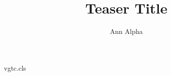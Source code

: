 \begin{filecontents*}[overwrite]{vgtc.cls}
\newcommand{\vgtc@empty}{}
\newcommand{\vgtc@teaser}{}
\newcommand{\teaser}[1]{\renewcommand{\vgtc@teaser}{\begin{minipage}{\linewidth}#1\end{minipage}}}
\newcommand{\vgtc@abstxt}{}
\let\origabstract\abstract
\let\endorigabstract\endabstract
\renewcommand{\abstract}[1]{\renewcommand{\vgtc@abstxt}{#1}}
\renewcommand{\@maketitle}{%
  \begin{center}%
    {\LARGE\@title\par}%
    \vspace{1\baselineskip}%
    \begin{tabular}[t]{c}\@author\end{tabular}\par
    \ifx\vgtc@teaser\vgtc@empty\else
      {\begingroup\def\@captype{figure}\vgtc@teaser\endgroup\par}%
    \fi
  \end{center}\par}
\let\vgtc@origmaketitle\maketitle
\renewcommand{\maketitle}{%
  \vgtc@origmaketitle
  \ifx\vgtc@abstxt\vgtc@empty\else
    \begingroup\begin{origabstract}\vgtc@abstxt\end{origabstract}\endgroup\par
  \fi}
\end{filecontents*}
\documentclass{vgtc}
\title{Teaser Title}
\author{Ann Alpha}

